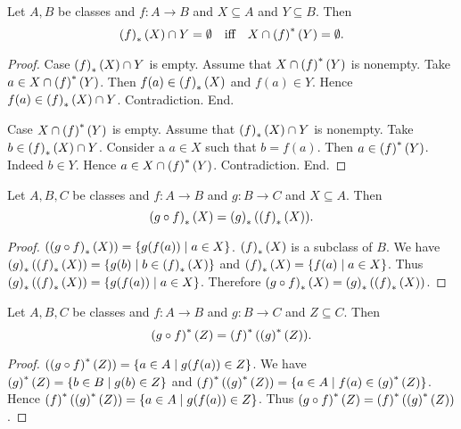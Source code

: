 \documentclass[../../set-theory/set-theory.tex]{subfiles}
\begin{document}
  \begin{forthel}
    \begin{proposition}
      Let $A, B$ be classes and $f : A \to B$ and $X \subseteq A$ and
      $Y \subseteq B$.
      Then \[ \left(f\right)_{*}(X) \cap Y = \emptyset \quad \text{iff} \quad X \cap \left(f\right)^{*}(Y) = \emptyset. \]
    \end{proposition}
    \begin{proof}
      Case $\left(f\right)_{*}(X) \cap Y$ is empty.
        Assume that $X \cap \left(f\right)^{*}(Y)$ is nonempty.
        Take $a \in X \cap \left(f\right)^{*}(Y)$.
        Then $f(a) \in \left(f\right)_{*}(X)$ and $f(a) \in Y$.
        Hence $f(a) \in \left(f\right)_{*}(X) \cap Y$.
        Contradiction.
      End.

      Case $X \cap \left(f\right)^{*}(Y)$ is empty.
        Assume that $\left(f\right)_{*}(X) \cap Y$ is nonempty.
        Take $b \in \left(f\right)_{*}(X) \cap Y$.
        Consider a $a \in X$ such that $b = f(a)$.
        Then $a \in \left(f\right)^{*}(Y)$.
        Indeed $b \in Y$.
        Hence $a \in X \cap \left(f\right)^{*}(Y)$.
        Contradiction.
      End.
    \end{proof}
  \end{forthel}

  \begin{forthel}
    \begin{proposition}
      Let $A, B, C$ be classes and $f : A \to B$ and $g : B \to C$ and
      $X \subseteq A$.
      Then \[ \left(g \circ f\right)_{*}(X) = \left(g\right)_{*}(\left(f\right)_{*}(X)). \]
    \end{proposition}
    \begin{proof}
      $(\left(g \circ f\right)_{*}(X)) = \{ g(f(a)) \mid a \in X \}$. %
      $\left(f\right)_{*}(X)$ is a subclass of $B$.
      We have $\left(g\right)_{*}(\left(f\right)_{*}(X)) = \{ g(b) \mid \text{$b \in \left(f\right)_{*}(X)$} \}$ and
      $\left(f\right)_{*}(X) = \{ f(a) \mid a \in X \}$.
      Thus $\left(g\right)_{*}(\left(f\right)_{*}(X)) = \{ g(f(a)) \mid a \in X \}$.
      Therefore $\left(g \circ f\right)_{*}(X) = \left(g\right)_{*}(\left(f\right)_{*}(X))$.
    \end{proof}
  \end{forthel}

  \begin{forthel}
    \begin{proposition}
      Let $A, B, C$ be classes and $f : A \to B$ and $g : B \to C$ and
      $Z \subseteq C$.
      Then \[ \left(g \circ f\right)^{*}(Z) = \left(f\right)^{*}(\left(g\right)^{*}(Z)). \]
    \end{proposition}
    \begin{proof}
      $(\left(g \circ f\right)^{*}(Z)) = \{ a \in A \mid g(f(a)) \in Z \}$.
      We have $\left(g\right)^{*}(Z) = \{ b \in B \mid g(b) \in Z \}$ and
      $\left(f\right)^{*}(\left(g\right)^{*}(Z)) = \{ a \in A \mid f(a) \in \left(g\right)^{*}(Z) \}$.
      Hence $\left(f\right)^{*}(\left(g\right)^{*}(Z)) = \{ a \in A \mid g(f(a)) \in Z \}$.
      Thus $\left(g \circ f\right)^{*}(Z) = \left(f\right)^{*}(\left(g\right)^{*}(Z))$.
    \end{proof}
  \end{forthel}
\end{document}
